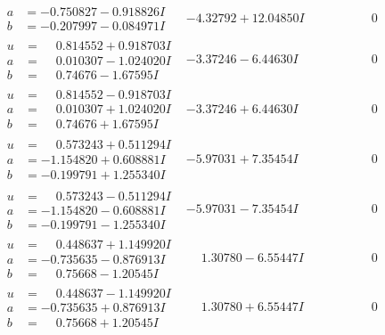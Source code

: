 \documentclass[1p]{elsarticle_modified}
\theoremstyle{definition}
\begin{document}
$$\begin{array}{c|c|c}
\begin{aligned}
a &= -0.750827 - 0.918826 I \\
b &= -0.207997 - 0.084971 I\end{aligned}
 & -4.32792 + 12.04850 I & \phantom{-0.000000 } 0 \\ \hline\begin{aligned}
u &= \phantom{-}0.814552 + 0.918703 I \\
a &= \phantom{-}0.010307 - 1.024020 I \\
b &= \phantom{-}0.74676 - 1.67595 I\end{aligned}
 & -3.37246 - 6.44630 I & \phantom{-0.000000 } 0 \\ \hline\begin{aligned}
u &= \phantom{-}0.814552 - 0.918703 I \\
a &= \phantom{-}0.010307 + 1.024020 I \\
b &= \phantom{-}0.74676 + 1.67595 I\end{aligned}
 & -3.37246 + 6.44630 I & \phantom{-0.000000 } 0 \\ \hline\begin{aligned}
u &= \phantom{-}0.573243 + 0.511294 I \\
a &= -1.154820 + 0.608881 I \\
b &= -0.199791 + 1.255340 I\end{aligned}
 & -5.97031 + 7.35454 I & \phantom{-0.000000 } 0 \\ \hline\begin{aligned}
u &= \phantom{-}0.573243 - 0.511294 I \\
a &= -1.154820 - 0.608881 I \\
b &= -0.199791 - 1.255340 I\end{aligned}
 & -5.97031 - 7.35454 I & \phantom{-0.000000 } 0 \\ \hline\begin{aligned}
u &= \phantom{-}0.448637 + 1.149920 I \\
a &= -0.735635 - 0.876913 I \\
b &= \phantom{-}0.75668 - 1.20545 I\end{aligned}
 & \phantom{-}1.30780 - 6.55447 I & \phantom{-0.000000 } 0 \\ \hline\begin{aligned}
u &= \phantom{-}0.448637 - 1.149920 I \\
a &= -0.735635 + 0.876913 I \\
b &= \phantom{-}0.75668 + 1.20545 I\end{aligned}
 & \phantom{-}1.30780 + 6.55447 I & \phantom{-0.000000 } 0\\

\end{array}$$
\end{document}

